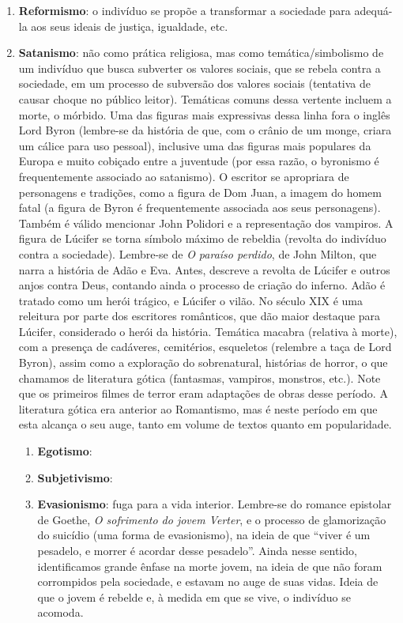 \documentclass[12pt]{book}
\begin{document}
\begin{enumerate}
\begin{enumerate}
				\item \textbf{Reformismo}: o indivíduo se propõe a transformar a sociedade para adequá-la aos seus ideais de justiça, igualdade, etc.
				\item \textbf{Satanismo}: não como prática religiosa, mas como temática/simbolismo de um indivíduo que busca subverter os valores sociais, que se rebela contra a sociedade, em um processo de subversão dos valores sociais (tentativa de causar choque no público leitor). Temáticas comuns dessa vertente incluem a morte, o mórbido. Uma das figuras mais expressivas dessa linha fora o inglês Lord Byron (lembre-se da história de que, com o crânio de um monge, criara um cálice para uso pessoal), inclusive uma das figuras mais populares da Europa e muito cobiçado entre a juventude (por essa razão, o byronismo é frequentemente associado ao satanismo). O escritor se apropriara de personagens e tradições, como a figura de Dom Juan, a imagem do homem fatal (a figura de Byron é frequentemente associada aos seus personagens). Também é válido mencionar John Polidori e a representação dos vampiros. A figura de Lúcifer se torna símbolo máximo de rebeldia (revolta do indivíduo contra a sociedade). Lembre-se de \textit{O paraíso perdido}, de John Milton, que narra a história de Adão e Eva. Antes, descreve a revolta de Lúcifer e outros anjos contra Deus, contando ainda o processo de criação do inferno. Adão é tratado como um herói trágico, e Lúcifer o vilão. No século XIX é uma releitura por parte dos escritores românticos, que dão maior destaque para Lúcifer, considerado o herói da história. Temática macabra (relativa à morte), com a presença de cadáveres, cemitérios, esqueletos (relembre a taça de Lord Byron), assim como a exploração do sobrenatural, histórias de horror, o que chamamos de literatura gótica (fantasmas, vampiros, monstros, etc.). Note que os primeiros filmes de terror eram adaptações de obras desse período. A literatura gótica era anterior ao Romantismo, mas é neste período em que esta alcança o seu auge, tanto em volume de textos quanto em popularidade.
				\begin{enumerate}
					\item \textbf{Egotismo}:
					\item \textbf{Subjetivismo}:
					\item \textbf{Evasionismo}: fuga para a vida interior. Lembre-se do romance epistolar de Goethe, \textit{O sofrimento do jovem Verter}, e o processo de glamorização do suicídio (uma forma de evasionismo), na ideia de que ``viver é um pesadelo, e morrer é acordar desse pesadelo''. Ainda nesse sentido, identificamos grande ênfase na morte jovem, na ideia de que não foram corrompidos pela sociedade, e estavam no auge de suas vidas. Ideia de que o jovem é rebelde e, à medida em que se vive, o indivíduo se acomoda.

\end{enumerate}
\end{enumerate}
\end{enumerate}
\end{document}
